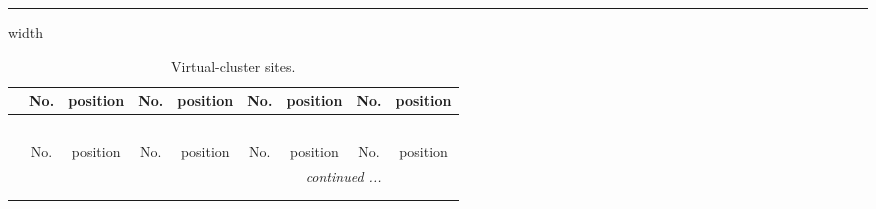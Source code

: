 \documentclass[fleqn,10pt,landscape]{article}
\begin{document}
\begin{itemize}
 \hfil \hrule height 1mm width \textwidth \hfil

{
\scriptsize
\begin{center}
\renewcommand{\arraystretch}{1.7}
\begin{longtable}{ccccccccc}
\caption{Virtual-cluster sites.}
 \\
 \hline \hline
 & No. & position & No. & position & No. & position & No. & position \\ \hline \endfirsthead

\multicolumn{8}{l}{\tablename\ \thetable{}} \\
 \hline \hline
 & No. & position & No. & position & No. & position & No. & position \\ \hline \endhead

 \hline \hline
\multicolumn{8}{r}{\footnotesize\it continued ...} \\ \endfoot

 \hline \hline
\multicolumn{8}{r}{} \\ \endlastfoot


\end{longtable}
\end{center}}
\end{itemize}
\end{document}
